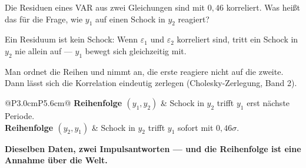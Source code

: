 \begin{aufgabe}
Die Residuen eines VAR aus zwei Gleichungen sind mit $0{,}46$ korreliert. Was heißt das für die Frage, wie $y_1$ auf einen Schock in $y_2$ reagiert?

\loesung
{}
Ein Residuum ist kein Schock: Wenn $\varepsilon_1$ und $\varepsilon_2$ korreliert sind, tritt ein Schock in $y_2$ nie allein auf --- $y_1$ bewegt sich gleichzeitig mit.

Man ordnet die Reihen und nimmt an, die erste reagiere  nicht auf die zweite. Dann lässt sich die Korrelation eindeutig zerlegen (Cholesky-Zerlegung, Band 2).

\begin{center}
{\small
\renewcommand{\arraystretch}{1.5}
\begin{tabular}{@{}P{3.0cm}P{5.6cm}@{}}
\toprule
\textbf{Reihenfolge $(y_1,y_2)$} & Schock in $y_2$ trifft $y_1$ erst nächste Periode.\\
\textbf{Reihenfolge $(y_2,y_1)$} & Schock in $y_2$ trifft $y_1$ sofort mit $0{,}46\sigma$.\\
\bottomrule
\end{tabular}}
\end{center}

\begin{center}
\begin{minipage}{0.9\textwidth}
\textbf{Dieselben Daten, zwei Impulsantworten --- und die Reihenfolge ist eine Annahme über die Welt.}
\end{minipage}
\end{center}

\begin{center}
\begin{minipage}{0.88\textwidth}
\end{minipage}
\end{center}
\end{aufgabe}

